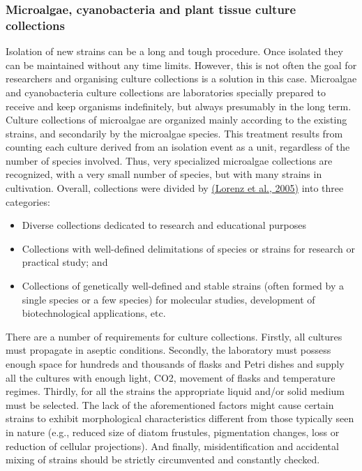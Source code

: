 \subsubsection{Microalgae, cyanobacteria and plant tissue culture collections}
Isolation of new strains can be a long and tough procedure. Once isolated they can be maintained without any time limits. However, this is not often the goal for researchers and organising culture collections is a solution in this case. Microalgae and cyanobacteria culture collections are laboratories specially prepared to receive and keep organisms indefinitely, but always presumably in the long term. 
\newline\newline
Culture collections of microalgae are organized mainly according to the existing strains, and secondarily by the microalgae species. This treatment results from counting each culture derived from an isolation event as a unit, regardless of the number of species involved. Thus, very specialized microalgae collections are recognized, with a very small number of species, but with many strains in cultivation. 
\newline\newline 
Overall, collections were divided by \href{https://www.elsevier.com/books/algal-culturing-techniques/andersen/978-0-12-088426-1}{(Lorenz et al., 2005)} into three categories: 
\begin{itemize}
    \item Diverse collections dedicated to research and educational purposes
    \item Collections with well-defined delimitations of species or strains for research or practical study; and
    \item Collections of genetically well-defined and stable strains (often formed by a single
species or a few species) for molecular studies, development of biotechnological applications, etc.
\end{itemize}
\noindent
There are a number of requirements for culture collections. Firstly, all cultures must propagate in aseptic conditions. Secondly, the laboratory must possess enough space for hundreds and thousands of flasks and Petri dishes and supply all the cultures with enough light, CO2, movement of flasks and temperature regimes. Thirdly, for all the strains the appropriate liquid and/or solid medium must be selected.  The lack of the aforementioned factors might cause certain strains to exhibit morphological characteristics different from those typically seen in nature (e.g., reduced size of diatom frustules, pigmentation changes, loss or reduction of cellular projections). And finally, misidentification and accidental mixing of strains should be strictly circumvented and constantly checked. 

